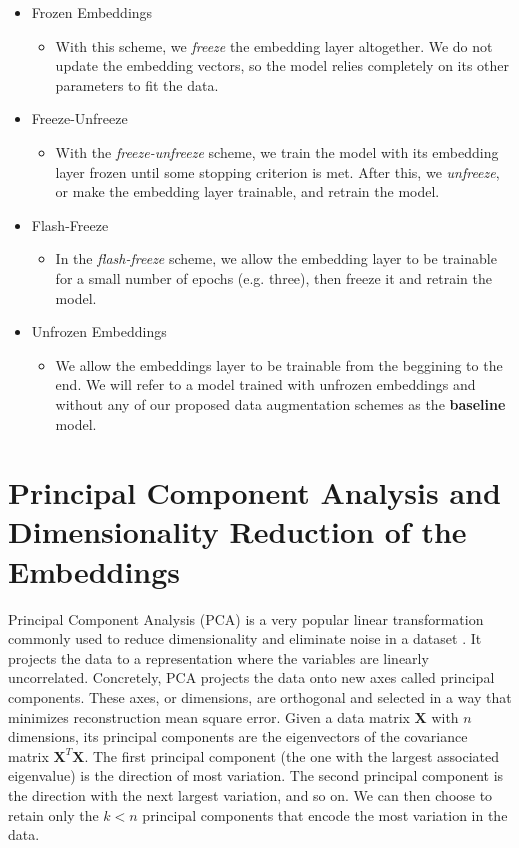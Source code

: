 \begin{itemize}
  \item{Frozen Embeddings}
  \begin{itemize}
    \item{With this scheme, we \textit{freeze} the embedding layer altogether. We do not update
    the embedding vectors, so the model relies completely on its other parameters to fit the data.}
  \end{itemize}
  \item{Freeze-Unfreeze}
  \begin{itemize}
    \item{With the \textit{freeze-unfreeze} scheme, we train the model with its embedding layer frozen until some
    stopping criterion is met. After this, we \textit{unfreeze}, or make the
    embedding layer trainable, and retrain the model.}
  \end{itemize}
  \item{Flash-Freeze}
  \begin{itemize}
    \item{In the \textit{flash-freeze} scheme, we allow the embedding layer to be trainable for a small number of
    epochs (e.g. three), then freeze it and retrain the model.}
  \end{itemize}
  \item{Unfrozen Embeddings}
  \begin{itemize}
    \item{We allow the embeddings layer to be trainable from the beggining to the end.
    We will refer to a model trained with unfrozen embeddings and without any of our proposed data augmentation schemes as the \textbf{baseline} model.}
  \end{itemize}
\end{itemize}

\section{Principal Component Analysis and Dimensionality Reduction of the Embeddings}
Principal Component Analysis (PCA) is a very popular linear transformation commonly used to reduce dimensionality and eliminate noise in a dataset \cite{DBLP:journals/corr/Shlens14}.
It projects the data to a representation where the variables are linearly uncorrelated. Concretely, PCA projects the data onto new axes called principal
components. These axes, or dimensions, are orthogonal and selected in a way that minimizes reconstruction mean square error.
Given a data matrix $\bm{X}$ with $n$ dimensions, its principal components are the eigenvectors of the covariance matrix $\bm{X}^T\bm{X}$.
The first principal component (the one with the largest associated eigenvalue) is the direction of most variation. The second principal component is the direction with the next largest variation,
and so on. We can then choose to retain only the $k<n$ principal components that encode the most variation in the data.

